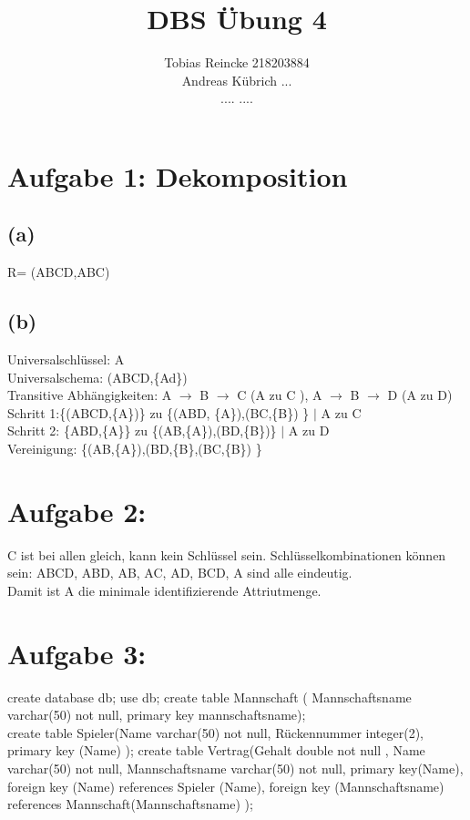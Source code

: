 \documentclass[11pt]{article} %
\title{\color{blue}DBS Übung 4}
\author{Tobias Reincke 218203884 \\
	Andreas Kübrich ... \\
              ....                    ....}
\begin{document}
\maketitle
\section*{ \textbf{Aufgabe 1: Dekomposition}}

\subsection*{(a)} R= (ABCD,{ABC})
\subsection*{(b)} Universalschlüssel: A \\
Universalschema: (ABCD,\{Ad\})\\                                                                                                                                        
Transitive Abhängigkeiten: A $\rightarrow$ B $\rightarrow$ C (A zu C ), A $\rightarrow$ B $\rightarrow$ D (A zu D)\\ 
Schritt 1:\{(ABCD,\{A\})\} zu \{(ABD, \{A\}),(BC,\{B\}) \} $|$ A zu C \\
Schritt 2: \{ABD,\{A\}\} zu  \{(AB,\{A\}),(BD,\{B\})\} $|$ A zu D \\
Vereinigung: \{(AB,\{A\}),(BD,\{B\},(BC,\{B\}) \}

\section*{\textbf{Aufgabe 2: }}
C ist bei allen gleich, kann kein Schlüssel sein.
Schlüsselkombinationen können sein: 
ABCD, ABD, AB, AC, AD,  BCD, A sind alle eindeutig. \\
Damit ist A die minimale identifizierende Attriutmenge.


\section*{\textbf{Aufgabe 3:}}
create  database db; 
use db;
create table Mannschaft ( Mannschaftsname varchar(50) not null, primary key mannschaftsname);\\
create table Spieler(Name varchar(50) not null,  Rückennummer integer(2), primary key (Name) );
create table Vertrag(Gehalt double not null , Name varchar(50) not null, Mannschaftsname varchar(50) not null, primary key(Name), foreign key (Name) references Spieler (Name), foreign key (Mannschaftsname) references Mannschaft(Mannschaftsname) );
\end{document}
